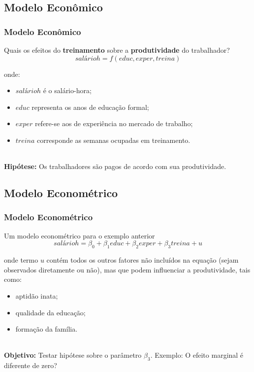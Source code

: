 \documentclass[pdf,9pt,xcolor=dvipsnames,hide notes]{beamer}\usepackage[]{graphicx}\usepackage[]{color}
\begin{document}
\subsection{Modelo Econômico}
\begin{frame}\frametitle{Modelo Econômico}
Quais os efeitos do \textbf{treinamento} sobre a \textbf{produtividade} do trabalhador?
\begin{equation}
salárioh = f\left( educ, exper, treina \right)
\end{equation}

onde: 
  \begin{itemize}
    \item $salárioh$ é o salário-hora;
    \item $educ$ representa os anos de educação formal;
    \item $exper$ refere-se aos de experiência no mercado de trabalho;
    \item $treina$ corresponde as semanas ocupadas em treinamento.\\~\\
  \end{itemize}

\textbf{Hipótese:} Os trabalhadores são pagos de acordo com sua produtividade.
\end{frame}

\subsection{Modelo Econométrico}
\begin{frame}\frametitle{Modelo Econométrico} 
Um modelo econométrico para o exemplo anterior
\begin{equation}
salárioh ={\beta}_{0}+{\beta}_{1}educ+{\beta}_{2}exper+{\beta}_{3}treina+u
\end{equation}

onde termo $u$ contém todos os outros fatores não incluídos na equação (sejam observados diretamente ou não), mas que podem influenciar a produtividade, tais como:
  \begin{itemize}
    \item aptidão inata;
    \item qualidade da educação;
    \item formação da família.\\~\\
  \end{itemize}
\textbf{Objetivo:} Testar hipótese sobre o parâmetro ${\beta}_{3}$. Exemplo: O efeito marginal é diferente de zero?
\end{frame}
\end{document}
